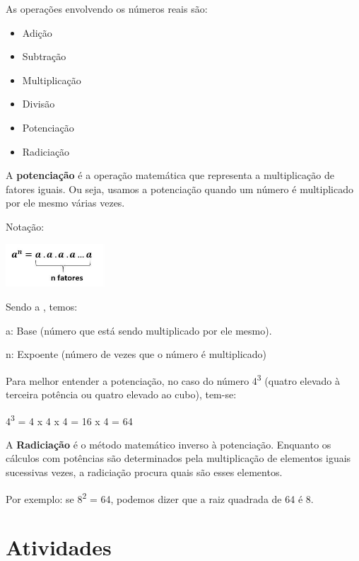 \begin{escolha}
{As operações envolvendo os números reais são:

\begin{itemize}
  \item Adição

  \item Subtração

  \item Multiplicação

  \item Divisão

  \item Potenciação

  \item Radiciação
\end{itemize}

A \textbf{potenciação} é a operação matemática que representa a
multiplicação de fatores iguais. Ou seja, usamos a potenciação quando um
número é multiplicado por ele mesmo várias vezes.

Notação:

\includegraphics[width=1.46875in,height=0.63399in]{./_SAEB_9_MAT/media/image32.jpeg}

Sendo a , temos:

\begin{myquote}
a: Base (número que está sendo multiplicado por ele mesmo).

n: Expoente (número de vezes que o número é multiplicado)
\end{myquote}

Para melhor entender a potenciação, no caso do número
4\textsuperscript{3} (quatro elevado à terceira potência ou quatro
elevado ao cubo), tem-se:

\begin{myquote}
4\textsuperscript{3} = 4 x 4 x 4 = 16 x 4 = 64
\end{myquote}

A \textbf{Radiciação} é o método matemático inverso à potenciação. Enquanto os
cálculos com potências são determinados pela multiplicação de elementos
iguais sucessivas vezes, a radiciação procura quais são esses elementos.

Por exemplo: se 8\textsuperscript{2} = 64, podemos dizer que a raiz quadrada de
64 é 8.
}

\section{Atividades}


\end{escolha}
